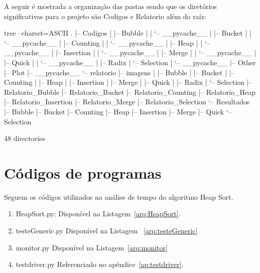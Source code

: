 \documentclass[12pt,a4paper,twoside]{report}
\begin{document}
A seguir é mostrada a organização das pastas sendo que os diretórios significativas para o projeto são Codigos e Relatorio além do raíz:
\begin{terminal}
tree --charset=ASCII
.
|-- Codigos
|   |-- Bubble
|   |   `-- __pycache__
|   |-- Bucket
|   |   `-- __pycache__
|   |-- Counting
|   |   `-- __pycache__
|   |-- Heap
|   |   `-- __pycache__
|   |-- Insertion
|   |   `-- __pycache__
|   |-- Merge
|   |   `-- __pycache__
|   |-- Quick
|   |   `-- __pycache__
|   |-- Radix
|   `-- Selection
|       `-- __pycache__
|-- Other
|-- Plot
|-- __pycache__
`-- relatorio
    |-- imagens
    |   |-- Bubble
    |   |-- Bucket
    |   |-- Counting
    |   |-- Heap
    |   |-- Insertion
    |   |-- Merge
    |   |-- Quick
    |   |-- Radix
    |   `-- Selection
    |-- Relatorio_Bubble
    |-- Relatorio_Bucket
    |-- Relatorio_Counting
    |-- Relatorio_Heap
    |-- Relatorio_Insertion
    |-- Relatorio_Merge
    |-- Relatorio_Selection
    `-- Resultados
        |-- Bubble
        |-- Bucket
        |-- Counting
        |-- Heap
        |-- Insertion
        |-- Merge
        |-- Quick
        `-- Selection

48 directories


\end{terminal}

\section{Códigos de programas}
Seguem os códigos utilizados na análise de tempo do algoritmo Heap Sort.
\begin{enumerate}

\item HeapSort.py:
Disponível na Listagem~\ref{arq:HeapSort}.


\item testeGeneric.py
Disponível na Listagem ~\ref{arq:testeGeneric}


\item monitor.py
Disponível na Listagem~\ref{arq:monitor}



\item testdriver.py
 Referenciado no apêndice~\ref{ap:testdriver}.
\end{enumerate}
\end{document}
